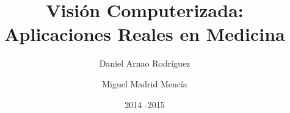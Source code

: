 \title{Visión Computerizada: Aplicaciones Reales en Medicina}

\author{Daniel Arnao Rodríguez \and Miguel Madrid Mencía }

\date{2014 -2015}

\maketitle
